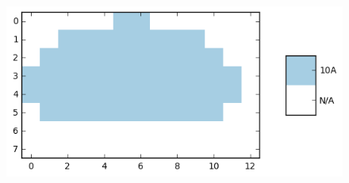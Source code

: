 \begin{figure}
\begin{minipage}[c]{.33\linewidth}
  \end{minipage} \hfill
  \begin{minipage}[c]{.32\linewidth}
    \includegraphics[width=\textwidth]{figures/sample1_labels.png}
  \end{minipage}


\end{figure}
